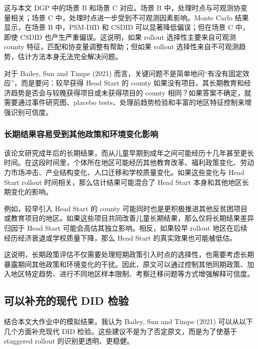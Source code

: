 \documentclass[
  fontset=windows]{ctexart}
\begin{document}
这与本文 DGP 中的场景 B 和场景 C 对应。场景 B
中，处理时点与可观测协变量相关；场景 C
中，处理时点进一步受到不可观测因素影响。Monte Carlo 结果显示，在场景 B
中，PSM-DID 和 CSDID 可以显著降低偏误；但在场景 C 中，即使 CSDID
也产生严重偏误。这说明，如果 rollout 选择性主要来自可观测 county
特征，匹配和协变量调整有帮助；但如果 rollout
选择性来自不可观测趋势，估计方法本身无法完全解决问题。

对于 Bailey, Sun and Timpe (2021)
而言，关键问题不是简单地问``有没有固定效应''，而是要问：较早获得 Head
Start 的 county
如果没有项目，其长期教育和经济趋势是否会与较晚获得项目或未获得项目的
county 相同？如果答案不确定，就需要通过事件研究图、placebo
tests、处理前趋势检验和丰富的地区特征控制来增强识别可信度。

\subsubsection{长期结果容易受到其他政策和环境变化影响}\label{ux957fux671fux7ed3ux679cux5bb9ux6613ux53d7ux5230ux5176ux4ed6ux653fux7b56ux548cux73afux5883ux53d8ux5316ux5f71ux54cd}

该论文研究成年后的长期结果，而从儿童早期到成年之间可能经历十几年甚至更长时间。在这段时间里，个体所在地区可能经历其他教育改革、福利政策变化、劳动力市场冲击、产业结构变化、人口迁移和学校质量变化。如果这些变化与
Head Start rollout 时间相关，那么估计结果可能混合了 Head Start
本身和其他地区长期变化的影响。

例如，较早引入 Head Start 的 county
可能同时也是更积极推进其他反贫困项目或教育项目的地区。如果这些项目共同改善儿童长期结果，那么仅将长期结果差异归因于
Head Start 可能会高估其独立影响。相反，如果较早 rollout
地区在后续经历经济衰退或学校质量下降，那么 Head Start
的真实效果也可能被低估。

这说明，长期政策评估不仅需要处理短期政策引入时点的选择性，也需要考虑长期暴露期间其他政策和环境变化的干扰。因此，原文可以通过控制其他同期政策、加入地区特定趋势、进行不同地区样本限制、考察迁移问题等方式增强解释可信度。

\subsection{可以补充的现代 DID
检验}\label{ux53efux4ee5ux8865ux5145ux7684ux73b0ux4ee3-did-ux68c0ux9a8c}

结合本文大作业中的模拟结果，我认为 Bailey, Sun and Timpe (2021)
可以从以下几个方面补充现代 DID
检验。这些建议不是为了否定原文，而是为了使基于 staggered rollout
的识别更透明、更稳健。
\end{document}
